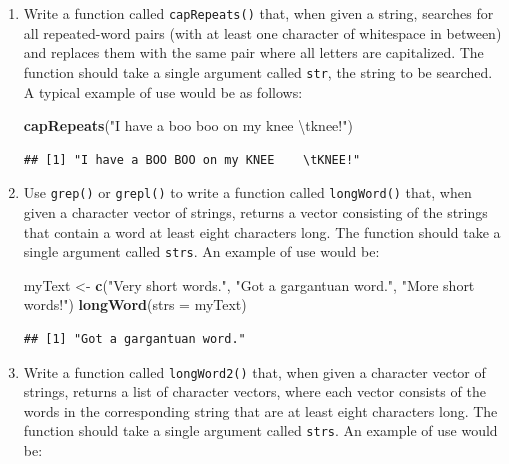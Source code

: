 \documentclass[]{book}
\makeatletter
\newenvironment{Shaded}{\begin{snugshade}}{\end{snugshade}}
\newcommand{\KeywordTok}[1]{\textcolor[rgb]{0.13,0.29,0.53}{\textbf{#1}}}
\newcommand{\DataTypeTok}[1]{\textcolor[rgb]{0.13,0.29,0.53}{#1}}
\newcommand{\CharTok}[1]{\textcolor[rgb]{0.31,0.60,0.02}{#1}}
\newcommand{\StringTok}[1]{\textcolor[rgb]{0.31,0.60,0.02}{#1}}
\newcommand{\NormalTok}[1]{#1}
\newenvironment{kframe}{%
\medskip{}
\setlength{\fboxsep}{.8em}
 \def\at@end@of@kframe{}%
 \ifinner\ifhmode%
  \def\at@end@of@kframe{\end{minipage}}%
  \begin{minipage}{\columnwidth}%
 \fi\fi%
 \def\FrameCommand##1{\hskip\@totalleftmargin \hskip-\fboxsep
 \colorbox{shadecolor}{##1}\hskip-\fboxsep
     \hskip-\linewidth \hskip-\@totalleftmargin \hskip\columnwidth}%
 \MakeFramed {\advance\hsize-\width
   \@totalleftmargin\z@ \linewidth\hsize
   \@setminipage}}%
 {\par\unskip\endMakeFramed%
 \at@end@of@kframe}
\renewenvironment{Shaded}{\begin{kframe}}{\end{kframe}}
\theoremstyle{definition}
\theoremstyle{definition}
\theoremstyle{definition}
\theoremstyle{remark}
\makeatother
\begin{document}
{\begin{enumerate}
\begin{verbatim}
## [1] "Tom"      "Thatcher" "Ellen"
\end{verbatim}
\item
  Write a function called \texttt{capRepeats()} that, when given a
  string, searches for all repeated-word pairs (with at least one
  character of whitespace in between) and replaces them with the same
  pair where all letters are capitalized. The function should take a
  single argument called \texttt{str}, the string to be searched. A
  typical example of use would be as follows:

\begin{Shaded}
\begin{Highlighting}[]
\KeywordTok{capRepeats}\NormalTok{(}\StringTok{"I have a boo boo on my knee    }\CharTok{\textbackslash{}t}\StringTok{knee!"}\NormalTok{)}
\end{Highlighting}
\end{Shaded}

\begin{verbatim}
## [1] "I have a BOO BOO on my KNEE    \tKNEE!"
\end{verbatim}
\item
  Use \texttt{grep()} or \texttt{grepl()} to write a function called
  \texttt{longWord()} that, when given a character vector of strings,
  returns a vector consisting of the strings that contain a word at
  least eight characters long. The function should take a single
  argument called \texttt{strs}. An example of use would be:

\begin{Shaded}
\begin{Highlighting}[]
\NormalTok{myText <-}\StringTok{ }\KeywordTok{c}\NormalTok{(}\StringTok{"Very short words."}\NormalTok{, }\StringTok{"Got a gargantuan word."}\NormalTok{, }\StringTok{"More short words!"}\NormalTok{)}
\KeywordTok{longWord}\NormalTok{(}\DataTypeTok{strs =}\NormalTok{ myText)}
\end{Highlighting}
\end{Shaded}

\begin{verbatim}
## [1] "Got a gargantuan word."
\end{verbatim}
\item
  Write a function called \texttt{longWord2()} that, when given a
  character vector of strings, returns a list of character vectors,
  where each vector consists of the words in the corresponding string
  that are at least eight characters long. The function should take a
  single argument called \texttt{strs}. An example of use would be:


\end{enumerate}}
\end{document}

